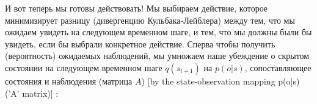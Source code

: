 \documentclass[twoside,leqno, 11pt]{article}
\begin{document}
	\begin{figure}[h]
	\end{figure}
	
	
	И вот теперь мы готовы действовать! Мы выбираем действие, которое минимизирует разницу (дивергенцию Кульбака-Лейблера) между тем, что мы ожидаем увидеть на следующем временном шаге, и тем, что мы должны были бы увидеть, если бы выбрали конкретное действие. Сперва чтобы получить (вероятность) ожидаемых наблюдений, мы умножаем наше убеждение о скрытом состоянии на следующем временном шаге $q(s_{t+1})$ на $p(o|s)$, сопоставляющее состояния и наблюдения (матрица $A$) [by the state-observation mapping p(o|s) ('A' matrix)] :
	
	\begin{figure}[h]
	\end{figure}
	
\end{document}
